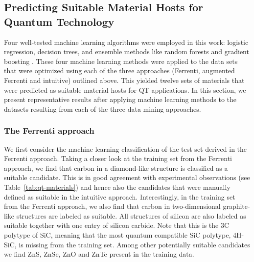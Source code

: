 \documentclass[superscriptaddress,unsortedaddress,
 amsmath,amssymb,
 aps,
]{revtex4-2}
\begin{document}
\subsection*{Predicting Suitable Material Hosts for Quantum Technology}
Four well-tested machine learning algorithms were employed in this work: logistic regression, decision trees, and ensemble methods like random forests and gradient boosting \cite{Mehta2019,Hastie2009}. 
These four machine learning methods were applied to the data sets that were optimized using each of the three approaches (Ferrenti, augmented Ferrenti and intuitive) outlined above. This yielded twelve sets of materials that were predicted as suitable material hosts for QT applications. In this section, we present representative results after applying machine learning methods to the datasets resulting from each of the three data mining approaches. 

\subsubsection*{The Ferrenti approach}
We first consider the machine learning classification of the test set derived in the Ferrenti approach. 
Taking a closer look at the training set from the Ferrenti approach, we find that carbon in a diamond-like structure is classified as a suitable candidate. 
This is in good agreement with experimental observations (see Table~\ref{tab:qt-materials}) and hence also the candidates that were manually defined as suitable in the intuitive approach.  
Interestingly, in the training set from the Ferrenti approach, we also find that carbon in two-dimensional graphite-like structures are labeled as suitable. 
All structures of silicon are also labeled as suitable together with one entry of silicon carbide. Note that this is the 3C polytype of SiC, meaning that the most quantum compatible SiC polytype, 4H-SiC, is missing from the training set. Among other potentially suitable candidates we find ZnS, ZnSe, ZnO and ZnTe present in the training data. 


\end{document}
